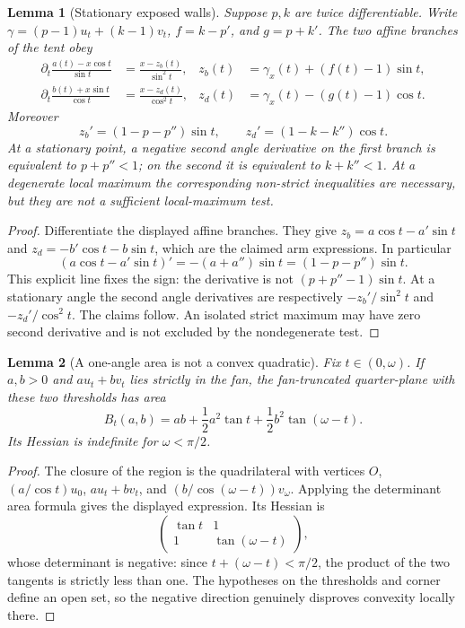 \documentclass[11pt]{article}
\newtheorem{lemma}{Lemma}
\begin{document}
\begin{lemma}[Stationary exposed walls]
Suppose $p,k$ are twice differentiable. Write $\gamma=(p-1)u_t+(k-1)v_t$, $f=k-p'$, and $g=p+k'$. The two affine branches of the tent obey
\begin{align*}
 \partial_t\frac{a(t)-x\cos t}{\sin t}
 &=\frac{x-z_b(t)}{\sin^2t},&z_b(t)&=\gamma_x(t)+(f(t)-1)\sin t,\\
 \partial_t\frac{b(t)+x\sin t}{\cos t}
 &=\frac{x-z_d(t)}{\cos^2t},&z_d(t)&=\gamma_x(t)-(g(t)-1)\cos t.
\end{align*}
Moreover
\[
 z_b'=(1-p-p'')\sin t,\qquad z_d'=(1-k-k'')\cos t.
\]
At a stationary point, a negative second angle derivative on the first branch is equivalent to $p+p''<1$; on the second it is equivalent to $k+k''<1$. At a degenerate local maximum the corresponding non-strict inequalities are necessary, but they are not a sufficient local-maximum test.
\end{lemma}
\begin{proof}
Differentiate the displayed affine branches. They give $z_b=a\cos t-a'\sin t$ and $z_d=-b'\cos t-b\sin t$, which are the claimed arm expressions. In particular
\[
 (a\cos t-a'\sin t)'=-(a+a'')\sin t=(1-p-p'')\sin t.
\]
This explicit line fixes the sign: the derivative is not $(p+p''-1)\sin t$. At a stationary angle the second angle derivatives are respectively $-z_b'/\sin^2t$ and $-z_d'/\cos^2t$. The claims follow. An isolated strict maximum may have zero second derivative and is not excluded by the nondegenerate test.
\end{proof}

\begin{lemma}[A one-angle area is not a convex quadratic]
Fix $t\in(0,\omega)$. If $a,b>0$ and $a u_t+b v_t$ lies strictly in the fan, the fan-truncated quarter-plane with these two thresholds has area
\[
 B_t(a,b)=ab+\frac12a^2\tan t+\frac12b^2\tan(\omega-t).
\]
Its Hessian is indefinite for $\omega<\pi/2$.
\end{lemma}
\begin{proof}
The closure of the region is the quadrilateral with vertices $O$, $(a/\cos t)u_0$, $a u_t+b v_t$, and $(b/\cos(\omega-t))v_\omega$. Applying the determinant area formula gives the displayed expression. Its Hessian is
\[
 \begin{pmatrix}\tan t&1\\1&\tan(\omega-t)\end{pmatrix},
\]
whose determinant is negative: since $t+(\omega-t)<\pi/2$, the product of the two tangents is strictly less than one. The hypotheses on the thresholds and corner define an open set, so the negative direction genuinely disproves convexity locally there.
\end{proof}
\end{document}
